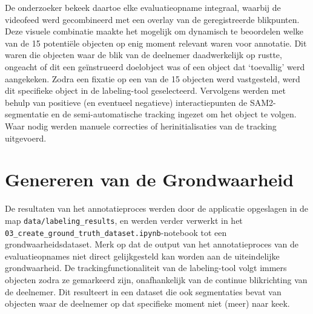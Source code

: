 De onderzoeker bekeek daartoe elke evaluatieopname integraal, waarbij de videofeed werd gecombineerd met een overlay 
van de geregistreerde blikpunten. Deze visuele combinatie maakte het mogelijk om dynamisch te beoordelen welke van de 15 potentiële 
objecten op enig moment relevant waren voor annotatie. Dit waren die objecten waar de blik van de deelnemer daadwerkelijk op rustte, 
ongeacht of dit een geïnstrueerd doelobject was of een object dat `toevallig' werd aangekeken. 
Zodra een fixatie op een van de 15 objecten werd vastgesteld, werd dit specifieke object in de labeling-tool geselecteerd. 
Vervolgens werden met behulp van positieve (en eventueel negatieve) interactiepunten de SAM2-segmentatie en de semi-automatische 
tracking ingezet om het object te volgen. Waar nodig werden manuele correcties of herinitialisaties van de tracking uitgevoerd.


\section{Genereren van de Grondwaarheid}

De resultaten van het annotatieproces werden door de applicatie opgeslagen in de map \texttt{data/labeling\_results}, en werden 
verder verwerkt in het \texttt{03\_create\_ground\_truth\_dataset.ipynb}-notebook tot een grondwaarheidsdataset.
Merk op dat de output van het annotatieproces van de evaluatieopnames niet direct gelijkgesteld kan worden aan de uiteindelijke grondwaarheid. 
De trackingfunctionaliteit van de labeling-tool volgt immers objecten zodra ze gemarkeerd zijn, onafhankelijk van de continue blikrichting van de deelnemer. 
Dit resulteert in een dataset die ook segmentaties bevat van objecten waar de deelnemer op dat specifieke moment niet (meer) naar keek.

